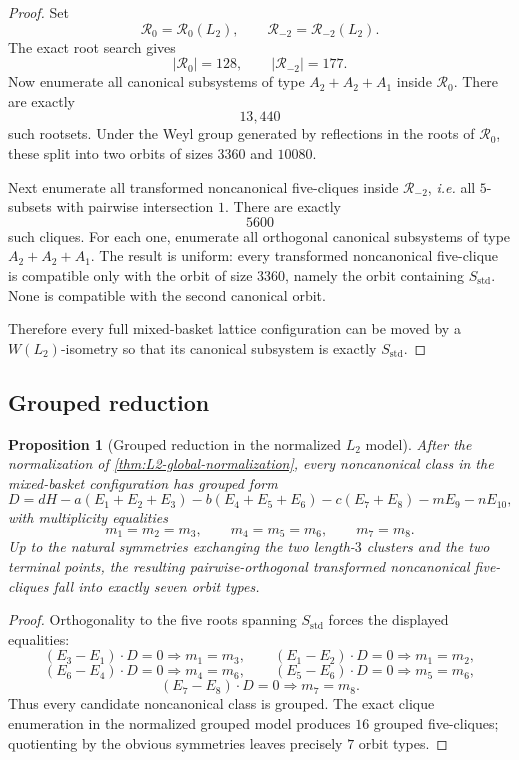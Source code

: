 \documentclass[11pt]{article}
\newtheorem{proposition}[proposition]{Proposition}
\theoremstyle{definition}
\newcommand{\ie}{\emph{i.e.}}
\begin{document}
\begin{proof}
Set
\[
\mathcal R_0=\mathcal R_0(L_2),\qquad \mathcal R_{-2}=\mathcal R_{-2}(L_2).
\]
The exact root search gives
\[
|\mathcal R_0|=128,
\qquad
|\mathcal R_{-2}|=177.
\]
Now enumerate all canonical subsystems of type $A_2+A_2+A_1$ inside $\mathcal R_0$. There are exactly
\[
13{,}440
\]
such rootsets. Under the Weyl group generated by reflections in the roots of $\mathcal R_0$, these split into two orbits of sizes $3360$ and $10080$.

Next enumerate all transformed noncanonical five-cliques inside $\mathcal R_{-2}$, 
\ie{} all $5$-subsets with pairwise intersection $1$. There are exactly
\[
5600
\]
such cliques. For each one, enumerate all orthogonal canonical subsystems of type $A_2+A_2+A_1$. The result is uniform: every transformed noncanonical five-clique is compatible only with the orbit of size $3360$, namely the orbit containing $S_{\mathrm{std}}$. None is compatible with the second canonical orbit.

Therefore every full mixed-basket lattice configuration can be moved by a $W(L_2)$-isometry so that its canonical subsystem is exactly $S_{\mathrm{std}}$.
\end{proof}

\subsection{Grouped reduction}

\begin{proposition}[Grouped reduction in the normalized $L_2$ model]\label{prop:grouped-reduction}
After the normalization of \cref{thm:L2-global-normalization}, every noncanonical class in the mixed-basket configuration has grouped form
\[
D=dH-a(E_1+E_2+E_3)-b(E_4+E_5+E_6)-c(E_7+E_8)-mE_9-nE_{10},
\]
with multiplicity equalities
\[
m_1=m_2=m_3,\qquad m_4=m_5=m_6,\qquad m_7=m_8.
\]
Up to the natural symmetries exchanging the two length-$3$ clusters and the two terminal points, the resulting pairwise-orthogonal transformed noncanonical five-cliques fall into exactly seven orbit types.
\end{proposition}

\begin{proof}
Orthogonality to the five roots spanning $S_{\mathrm{std}}$ forces the displayed equalities:
\[
(E_3-E_1)\cdot D=0\Rightarrow m_1=m_3,
\qquad
(E_1-E_2)\cdot D=0\Rightarrow m_1=m_2,
\]
\[
(E_6-E_4)\cdot D=0\Rightarrow m_4=m_6,
\qquad
(E_5-E_6)\cdot D=0\Rightarrow m_5=m_6,
\]
\[
(E_7-E_8)\cdot D=0\Rightarrow m_7=m_8.
\]
Thus every candidate noncanonical class is grouped. The exact clique enumeration in the normalized grouped model produces $16$ grouped five-cliques; quotienting by the obvious symmetries leaves precisely $7$ orbit types.
\end{proof}
\end{document}
